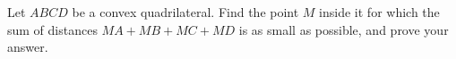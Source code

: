 Let $ABCD$ be a convex quadrilateral. Find the point $M$ inside it for which the sum of distances $MA+MB+MC+MD$ is as small as possible, and prove your answer.
